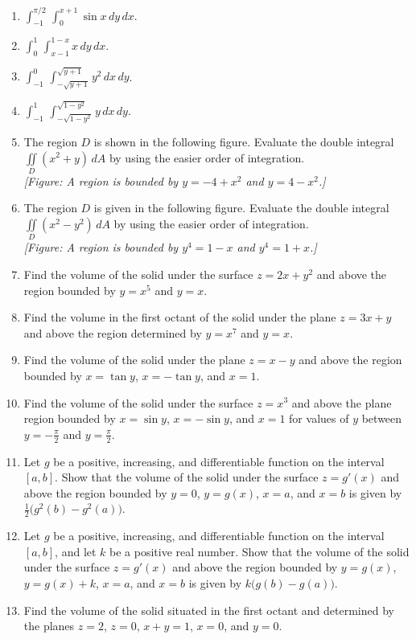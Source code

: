 \documentclass{exercises}
\begin{document}
\begin{enumerate}[resume]
\item $\int_{-1}^{\pi/2}\,\int_{0}^{x+1}\sin x\,dy\,dx$.
\item $\int_{0}^{1}\,\int_{x-1}^{1-x}x\,dy\,dx$.
\item $\int_{-1}^{0}\,\int_{-\sqrt{y+1}}^{\sqrt{y+1}}y^{2}\,dx\,dy$.
\item $\int_{-1}^{1}\,\int_{-\sqrt{1-y^{2}}}^{\sqrt{1-y^{2}}}y\,dx\,dy$.
\item The region $D$ is shown in the following figure. Evaluate the double integral $\underset{D}{\iint}(x^{2}+y)\,dA$ by using the easier order of integration. \\ \textit{[Figure: A region is bounded by $y=-4+x^2$ and $y=4-x^2$.]}
\item The region $D$ is given in the following figure. Evaluate the double integral $\underset{D}{\iint}(x^{2}-y^{2})\,dA$ by using the easier order of integration. \\ \textit{[Figure: A region is bounded by $y^4=1-x$ and $y^4=1+x$.]}
\item Find the volume of the solid under the surface $z=2x+y^{2}$ and above the region bounded by $y=x^{5}$ and $y=x$.
\item Find the volume in the first octant of the solid under the plane $z=3x+y$ and above the region determined by $y=x^{7}$ and $y=x$.
\item Find the volume of the solid under the plane $z=x-y$ and above the region bounded by $x=\tan y$, $x=-\tan y$, and $x=1$.
\item Find the volume of the solid under the surface $z=x^{3}$ and above the plane region bounded by $x=\sin y$, $x=-\sin y$, and $x=1$ for values of $y$ between $y=-\frac{\pi}{2}$ and $y=\frac{\pi}{2}$.
\item Let $g$ be a positive, increasing, and differentiable function on the interval $[a,b]$. Show that the volume of the solid under the surface $z=g'(x)$ and above the region bounded by $y=0$, $y=g(x)$, $x=a$, and $x=b$ is given by $\frac{1}{2}\bigl(g^{2}(b)-g^{2}(a)\bigr)$.
\item Let $g$ be a positive, increasing, and differentiable function on the interval $[a,b]$, and let $k$ be a positive real number. Show that the volume of the solid under the surface $z=g'(x)$ and above the region bounded by $y=g(x)$, $y=g(x)+k$, $x=a$, and $x=b$ is given by $k\bigl(g(b)-g(a)\bigr)$.
\item Find the volume of the solid situated in the first octant and determined by the planes $z=2$, $z=0$, $x+y=1$, $x=0$, and $y=0$.

\end{enumerate}
\end{document}
